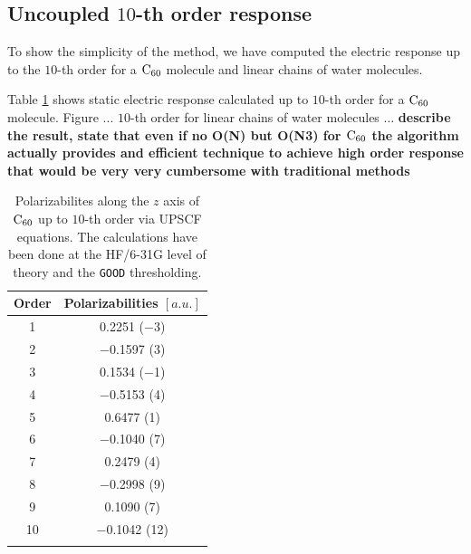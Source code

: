 \documentclass[prl,aps,twocolumn,showpacs,twocolumngrid,superbib]{revtex4}
\begin{document}
\subsection{Uncoupled $10$-th order response}



To show the simplicity of the method, we have computed 
the electric response up to the $10$-th order for a $\rm C_{60}$
molecule and linear chains of water molecules.

Table \ref{tab:C60_Values} shows static electric response
calculated up to $10$-th order for a $\rm C_{60}$ molecule.
Figure ... $10$-th order for linear chains of water molecules 
... {\bf describe the result, state
that even if no O(N) but O(N3) for $\rm C_{60}$ the algorithm actually 
provides and efficient technique to achieve high order response that
would be very very cumbersome with traditional methods}

\begin{table}[t]
  \centering
  \caption{
    Polarizabilites along the $z$ axis of $\rm C_{60}$ up 
    to $10$-th order via UPSCF equations.
    The calculations have been done at the HF/6-31G level of 
    theory and the {\tt GOOD} thresholding.
  }\label{tab:C60_Values}
  \begin{tabular}{cc}
    \toprule
    Order & Polarizabilities $[a.u.]$\\
    \hline
     1 &    0.2251 ($-$3)\\
     2 & $-$0.1597 (3)   \\
     3 &    0.1534 ($-$1)\\
     4 & $-$0.5153 (4)   \\
     5 &    0.6477 (1)   \\
     6 & $-$0.1040 (7)   \\
     7 &    0.2479 (4)   \\
     8 & $-$0.2998 (9)   \\
     9 &    0.1090 (7)   \\
    10 & $-$0.1042 (12)  \\
    \botrule
  \end{tabular}
\end{table}
\end{document}
